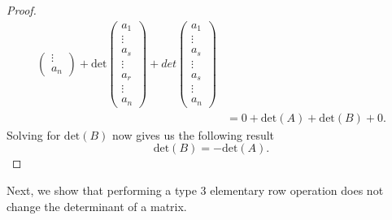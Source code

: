 \begin{proof}
\begin{align*}
\begin{pmatrix}
                                                  \vdots \\
                                                  {a}_{n}
                                                \end{pmatrix} +  \text{det} \begin{pmatrix} 
                                                          {a}_{1} \\ 
                                                          \vdots \\
                                                          {a}_{s} \\
                                                          \vdots \\
                                                          {a}_{r} \\
                                                          \vdots \\
                                                          {a}_{n}
                                                          \end{pmatrix} 
                                                          +  det \begin{pmatrix} 
                                                                     {a}_{1} \\
                                                                     \vdots \\ 
                                                                     {a}_{s} \\
                                                                     \vdots \\ 
                                                                     {a}_{s} \\
                                                                     \vdots \\
                                                                     {a}_{n}
                                                                    \end{pmatrix} \\
                                    &= 0 + \text{det}(A) + \text{det}(B) + 0. 
\end{align*}
Solving for \( \text{det}(B) \) now gives us the following result
\[  \text{det}(B) = - \text{det}(A). \]
\end{proof}

Next, we show that performing a type 3 elementary row operation does not change the determinant of a matrix.

